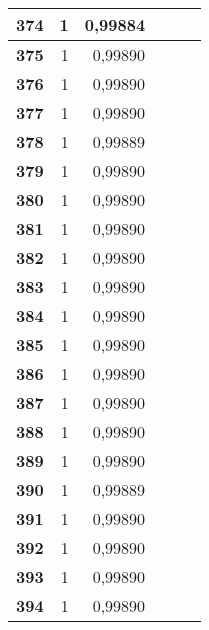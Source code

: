 {\begin{longtable}{|r|r|r|l|r|r|}
\textbf{374} & 1 & 0,99884 &  & \multicolumn{1}{l|}{} & \multicolumn{1}{l|}{} \\ \hline
\textbf{375} & 1 & 0,99890 &  & \multicolumn{1}{l|}{} & \multicolumn{1}{l|}{} \\ \hline
\textbf{376} & 1 & 0,99890 &  & \multicolumn{1}{l|}{} & \multicolumn{1}{l|}{} \\ \hline
\textbf{377} & 1 & 0,99890 &  & \multicolumn{1}{l|}{} & \multicolumn{1}{l|}{} \\ \hline
\textbf{378} & 1 & 0,99889 &  & \multicolumn{1}{l|}{} & \multicolumn{1}{l|}{} \\ \hline
\textbf{379} & 1 & 0,99890 &  & \multicolumn{1}{l|}{} & \multicolumn{1}{l|}{} \\ \hline
\textbf{380} & 1 & 0,99890 &  & \multicolumn{1}{l|}{} & \multicolumn{1}{l|}{} \\ \hline
\textbf{381} & 1 & 0,99890 &  & \multicolumn{1}{l|}{} & \multicolumn{1}{l|}{} \\ \hline
\textbf{382} & 1 & 0,99890 &  & \multicolumn{1}{l|}{} & \multicolumn{1}{l|}{} \\ \hline
\textbf{383} & 1 & 0,99890 &  & \multicolumn{1}{l|}{} & \multicolumn{1}{l|}{} \\ \hline
\textbf{384} & 1 & 0,99890 &  & \multicolumn{1}{l|}{} & \multicolumn{1}{l|}{} \\ \hline
\textbf{385} & 1 & 0,99890 &  & \multicolumn{1}{l|}{} & \multicolumn{1}{l|}{} \\ \hline
\textbf{386} & 1 & 0,99890 &  & \multicolumn{1}{l|}{} & \multicolumn{1}{l|}{} \\ \hline
\textbf{387} & 1 & 0,99890 &  & \multicolumn{1}{l|}{} & \multicolumn{1}{l|}{} \\ \hline
\textbf{388} & 1 & 0,99890 &  & \multicolumn{1}{l|}{} & \multicolumn{1}{l|}{} \\ \hline
\textbf{389} & 1 & 0,99890 &  & \multicolumn{1}{l|}{} & \multicolumn{1}{l|}{} \\ \hline
\textbf{390} & 1 & 0,99889 &  & \multicolumn{1}{l|}{} & \multicolumn{1}{l|}{} \\ \hline
\textbf{391} & 1 & 0,99890 &  & \multicolumn{1}{l|}{} & \multicolumn{1}{l|}{} \\ \hline
\textbf{392} & 1 & 0,99890 &  & \multicolumn{1}{l|}{} & \multicolumn{1}{l|}{} \\ \hline
\textbf{393} & 1 & 0,99890 &  & \multicolumn{1}{l|}{} & \multicolumn{1}{l|}{} \\ \hline
\textbf{394} & 1 & 0,99890 &  & \multicolumn{1}{l|}{} & \multicolumn{1}{l|}{} \\ \hline

\end{longtable}}
